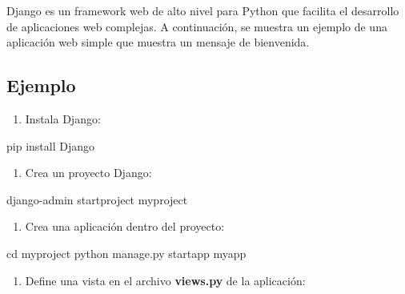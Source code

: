 \documentclass[
  a4paper,
  DIV=11,
  numbers=noendperiod,
  onepage,
  openany]{scrreprt}
\newenvironment{Shaded}{\begin{snugshade}}{\end{snugshade}}
\newcommand{\BuiltInTok}[1]{\textcolor[rgb]{0.00,0.23,0.31}{#1}}
\newcommand{\ExtensionTok}[1]{\textcolor[rgb]{0.00,0.23,0.31}{#1}}
\newcommand{\NormalTok}[1]{\textcolor[rgb]{0.00,0.23,0.31}{#1}}
\providecommand{\tightlist}{%
  \setlength{\itemsep}{0pt}\setlength{\parskip}{0pt}}\usepackage{longtable,booktabs,array}
\begin{document}
Django es un framework web de alto nivel para Python que facilita el
desarrollo de aplicaciones web complejas. A continuación, se muestra un
ejemplo de una aplicación web simple que muestra un mensaje de
bienvenida.

\subsection{Ejemplo}\label{ejemplo-2}

\begin{enumerate}
\def\labelenumi{\arabic{enumi}.}
\tightlist
\item
  Instala Django:
\end{enumerate}

\begin{Shaded}
\begin{Highlighting}[]
\ExtensionTok{pip}\NormalTok{ install Django}
\end{Highlighting}
\end{Shaded}

\begin{enumerate}
\def\labelenumi{\arabic{enumi}.}
\setcounter{enumi}{1}
\tightlist
\item
  Crea un proyecto Django:
\end{enumerate}

\begin{Shaded}
\begin{Highlighting}[]
\ExtensionTok{django{-}admin}\NormalTok{ startproject myproject}
\end{Highlighting}
\end{Shaded}

\begin{enumerate}
\def\labelenumi{\arabic{enumi}.}
\setcounter{enumi}{2}
\tightlist
\item
  Crea una aplicación dentro del proyecto:
\end{enumerate}

\begin{Shaded}
\begin{Highlighting}[]
\BuiltInTok{cd}\NormalTok{ myproject}
\ExtensionTok{python}\NormalTok{ manage.py startapp myapp}
\end{Highlighting}
\end{Shaded}

\begin{enumerate}
\def\labelenumi{\arabic{enumi}.}
\setcounter{enumi}{3}
\tightlist
\item
  Define una vista en el archivo \textbf{views.py} de la aplicación:
\end{enumerate}
\end{document}
